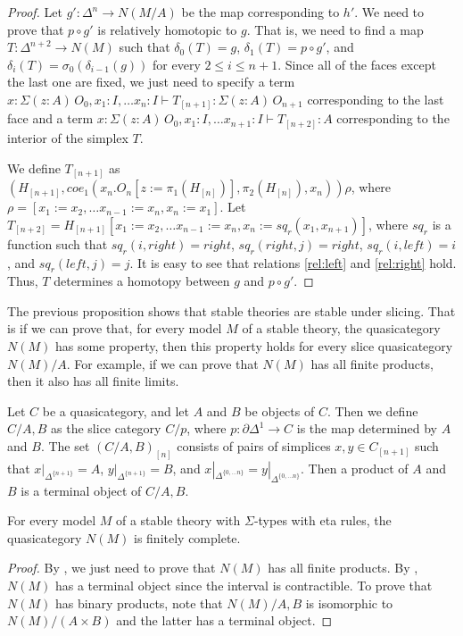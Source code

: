 \documentclass[reqno]{amsart}
\theoremstyle{definition}
\theoremstyle{remark}
\newcommand{\repl}{:=}
\numberwithin{figure}{section}
\begin{document}
\begin{proof}
Let $g' : \Delta^n \to N(M/A)$ be the map corresponding to $h'$.
We need to prove that $p \circ g'$ is relatively homotopic to $g$.
That is, we need to find a map $T : \Delta^{n+2} \to N(M)$ such that $\delta_0(T) = g$, $\delta_1(T) = p \circ g'$,
and $\delta_i(T) = \sigma_0(\delta_{i-1}(g))$ for every $2 \leq i \leq n+1$.
Since all of the faces except the last one are fixed, we just need to specify a term $x : \Sigma (z : A)\,O_0, x_1 : I, \ldots x_n : I \vdash T_{[n+1]} : \Sigma (z : A)\,O_{n+1}$
corresponding to the last face and a term $x : \Sigma (z : A)\,O_0, x_1 : I, \ldots x_{n+1} : I \vdash T_{[n+2]} : A$ corresponding to the interior of the simplex $T$.

We define $T_{[n+1]}$ as $(H_{[n+1]}, coe_1(x_n.O_n[z \repl \pi_1(H_{[n]})], \pi_2(H_{[n]}), x_n))\rho$, where $\rho = [x_1 \repl x_2, \ldots x_{n-1} \repl x_n, x_n \repl x_1]$.
Let $T_{[n+2]} = H_{[n+1]}[x_1 \repl x_2, \ldots x_{n-1} \repl x_n, x_n \repl sq_r(x_1, x_{n+1})]$,
where $sq_r$ is a function such that $sq_r(i,right) = right$, $sq_r(right,j) = right$, $sq_r(i,left) = i$, and $sq_r(left,j) = j$.
It is easy to see that relations \eqref{rel:left} and \eqref{rel:right} hold.
Thus, $T$ determines a homotopy between $g$ and $p \circ g'$.
\end{proof}

The previous proposition shows that stable theories are stable under slicing.
That is if we can prove that, for every model $M$ of a stable theory, the quasicategory $N(M)$ has some property,
then this property holds for every slice quasicategory $N(M)/A$.
For example, if we can prove that $N(M)$ has all finite products, then it also has all finite limits.

Let $C$ be a quasicategory, and let $A$ and $B$ be objects of $C$.
Then we define $C/A,B$ as the slice category $C/p$, where $p : \partial \Delta^1 \to C$ is the map determined by $A$ and $B$.
The set $(C/A,B)_{[n]}$ consists of pairs of simplices $x,y \in C_{[n+1]}$ such that
$x|_{\Delta^{\{n+1\}}} = A$, $y|_{\Delta^{\{n+1\}}} = B$, and $x|_{\Delta^{\{0, \ldots n\}}} = y|_{\Delta^{\{0, \ldots n\}}}$.
Then a product of $A$ and $B$ is a terminal object of $C/A,B$.

\begin{prop}
For every model $M$ of a stable theory with $\Sigma$-types with eta rules, the quasicategory $N(M)$ is finitely complete.
\end{prop}
\begin{proof}
By , we just need to prove that $N(M)$ has all finite products.
By , $N(M)$ has a terminal object since the interval is contractible.
To prove that $N(M)$ has binary products, note that $N(M)/A,B$ is isomorphic to $N(M)/(A \times B)$ and the latter has a terminal object.
\end{proof}
\end{document}
